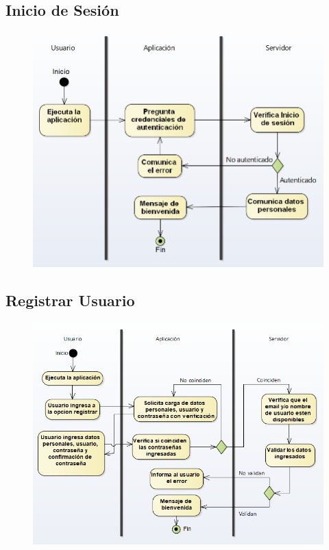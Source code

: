 		\subsection{Inicio de Sesión}
			\begin{figure}[H]
			\centering
				\includegraphics[width=1\textwidth]{imagenes/analisis/diagrama-actividad-inicioSesion.png}
				\label{fig:diagrama-actividad-autenticar}
			\end{figure}

		\subsection{Registrar Usuario}
			\begin{figure}[H]
			\centering
				\includegraphics[width=1\textwidth]{imagenes/analisis/diagrama-actividad-registrar.png}
				\label{fig:diagrama-actividad-registrar}
			\end{figure}

